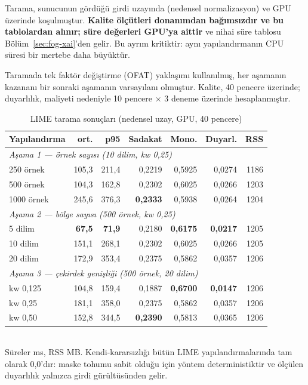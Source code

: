 \documentclass[conference]{IEEEtran}
\begin{document}
Tarama, sunucunun gördüğü girdi uzayında (nedensel normalizasyon) ve GPU
üzerinde koşulmuştur. \textbf{Kalite ölçütleri donanımdan bağımsızdır ve bu
tablolardan alınır; süre değerleri GPU'ya aittir} ve nihai süre tablosu
Bölüm~\ref{sec:fog-xai}'den gelir. Bu ayrım kritiktir: aynı yapılandırmanın CPU
süresi bir mertebe daha büyüktür.

Taramada tek faktör değiştirme (OFAT) yaklaşımı kullanılmış, her aşamanın
kazananı bir sonraki aşamanın varsayılanı olmuştur. Kalite, 40 pencere üzerinde;
duyarlılık, maliyeti nedeniyle 10 pencere $\times$ 3 deneme üzerinde
hesaplanmıştır.

\begin{table}[t]
\caption{LIME tarama sonuçları (nedensel uzay, GPU, 40 pencere)}
\label{tab:lime-sweep}
\centering
\scriptsize
\begin{tabular}{lrrrrrr}
\toprule
\textbf{Yapılandırma} & \textbf{ort.} & \textbf{p95} & \textbf{Sadakat} & \textbf{Mono.} & \textbf{Duyarl.} & \textbf{RSS}\\
\midrule
\multicolumn{7}{l}{\emph{Aşama 1 --- örnek sayısı (10 dilim, kw 0{,}25)}}\\
250 örnek   & 105{,}3 & 211{,}4 & 0{,}2219 & 0{,}5925 & 0{,}0274 & 1186\\
500 örnek   & 104{,}3 & 162{,}8 & 0{,}2302 & 0{,}6025 & 0{,}0266 & 1203\\
1000 örnek  & 245{,}6 & 376{,}3 & \textbf{0{,}2333} & 0{,}5938 & 0{,}0264 & 1204\\
\midrule
\multicolumn{7}{l}{\emph{Aşama 2 --- bölge sayısı (500 örnek, kw 0{,}25)}}\\
5 dilim     & \textbf{67{,}5} & \textbf{71{,}9} & 0{,}2180 & \textbf{0{,}6175} & \textbf{0{,}0217} & 1205\\
10 dilim    & 151{,}1 & 268{,}1 & 0{,}2302 & 0{,}6025 & 0{,}0266 & 1205\\
20 dilim    & 172{,}9 & 353{,}4 & 0{,}2375 & 0{,}5862 & 0{,}0357 & 1206\\
\midrule
\multicolumn{7}{l}{\emph{Aşama 3 --- çekirdek genişliği (500 örnek, 20 dilim)}}\\
kw 0{,}125  & 104{,}8 & 159{,}4 & 0{,}1887 & \textbf{0{,}6700} & \textbf{0{,}0147} & 1206\\
kw 0{,}25   & 181{,}1 & 358{,}0 & 0{,}2375 & 0{,}5862 & 0{,}0357 & 1206\\
kw 0{,}50   & 152{,}8 & 344{,}5 & \textbf{0{,}2390} & 0{,}5813 & 0{,}0365 & 1206\\
\bottomrule
\end{tabular}
\\[2pt]
\footnotesize Süreler ms, RSS MB. Kendi-kararsızlığı bütün LIME
yapılandırmalarında tam olarak 0{,}0'dır: maske tohumu sabit olduğu için yöntem
deterministiktir ve ölçülen duyarlılık yalnızca girdi gürültüsünden gelir.
\end{table}
\end{document}
